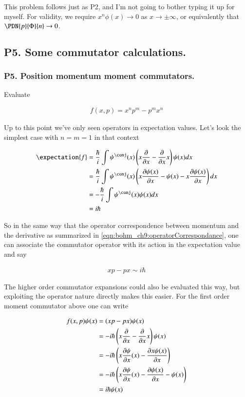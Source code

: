 This problem follows just as P2, and I'm not going to bother typing it up for myself.  For validity, we require
$x^n \phi(x) \rightarrow 0$ as $x \rightarrow \pm \infty$, or equivalently that $\PDN{p}{\Phi}{n} \rightarrow 0$.

\subsection{P5. Some commutator calculations. }

\subsubsection{P5. Position momentum moment commutators. }

Evaluate

\begin{align*}
f(x,p) = x^n p^m - p^m x^n
\end{align*}

Up to this point we've only seen operators in expectation values.  Let's look the simplest case with $n = m = 1$ in that
context

\begin{align*}
\expectation{f} 
&= \frac{\hbar}{i} \int \psi^\conj(x) \left(x \PD{x}{} - \PD{x}{} x \right) \psi(x) dx \\
&= \frac{\hbar}{i} \int \psi^\conj(x) \left(x \PD{x}{\psi(x)} - \psi(x) - x \PD{x}{\psi(x)} \right) dx \\
&= -\frac{\hbar}{i} \int \psi^\conj(x) \psi(x) dx \\
&= {i\hbar}
\end{align*}

So in the same way that the operator correspondence between momentum and the derivative as summarized in 
\ref{eqn:bohm_ch9:operatorCorrespondance}, one can associate the commutator operator with its action in the expectation value and
say

\begin{align}\label{eqn:bohm_ch9:commutator}
x p - p x \sim  i\hbar
\end{align}

The higher order commutator expansions could also be evaluated this way, but exploiting the operator nature directly 
makes this easier.  For the first order moment commutator above one can write

\begin{align*}
f(x,p) \psi(x) 
&= (x p - p x) \psi(x) \\
&= -i \hbar \left(x \PD{x}{} - \PD{x}{} x\right) \psi(x) \\
&= -i \hbar \left(x \PD{x}{\psi}(x) - \PD{x}{x \psi(x)} \right) \\
&= -i \hbar \left(x \PD{x}{\psi}(x) - \PD{x}{\psi(x)} -\psi(x) \right) \\
&= i \hbar \psi(x) \\
\end{align*}

